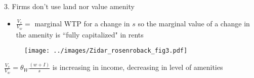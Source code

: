 \documentclass[10pt,notes=hide]{beamer}
\begin{document}
\begin{frame}{3. Firms don't use land nor value amenity}
\begin{itemize}
\item $\frac{V_s}{ V_w} =$ marginal WTP for a change in $s$ so the marginal value of a change in the amenity is ``fully capitalized" in rents
\end{itemize}
\begin{figure}
\texttt{[image: ../images/Zidar\_rosenroback\_fig3.pdf]}
\end{figure}
$\frac{V_s}{ V_w} = \theta_W \frac{\left(w + I\right)}{s}$ is increasing in income, decreasing in level of amenities
\end{frame}
\begin{comment}
\subsection{Inferring Amenity Values}
\begin{frame}
\frametitle{Inferring the Value of Amenities}
How do we infer the value of amenities in the more general case?
\begin{itemize}
\item $\Omega(s) = V(w(s), r(s), s)$ represents total utility of living in city $s$ 
\item If all cities have equal utility, then 
\begin{align}
\Omega'(s) &= V_ww'(s) + V_r r'(s) + V_s  = 0 \text{ in equilibrium} \nonumber\\
 V_s &= - V_ww'(s) - V_r r'(s) \nonumber\\
  V_s &= - V_ww'(s) +l^c V_w r'(s) \nonumber\\
 &\Rightarrow \frac{V_s}{V_w} = l^cr'(s) - w'(s) \label{eq_WTP}
\end{align}
\item So WTP for the amenity is extra land cost for consumers less lower wages in a higher-amenity city
\end{itemize}
item]{Eqn tells us that workers' WTP for the higher levels of amenity $s$ can be derived from combination of extra land cost and reduced wages}
\end{frame}
\begin{frame}
\frametitle{Inferring the Value of Amenities}
We can get more insight from looking at firms:
\begin{itemize}
\item Firms face $c(w(s), r(s), s) = 1$ across cities, so 

\end{comment}
\end{document}
